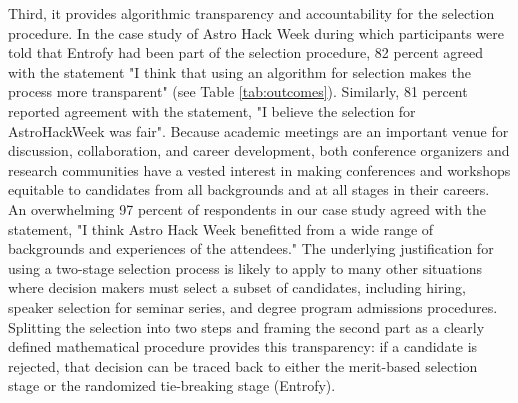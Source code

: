 \documentclass[10pt,letterpaper]{article}
\begin{document}
Third, it provides algorithmic transparency and accountability for the selection procedure. In the case study of Astro Hack Week during which participants were told that Entrofy had been part of the selection procedure, 82 percent agreed with the statement "I think that using an algorithm for selection makes the process more transparent" (see Table \ref{tab:outcomes}). Similarly, 81 percent reported agreement with the statement, "I believe the selection for AstroHackWeek was fair". Because academic meetings are an important venue for discussion, collaboration, and career development, both conference organizers and research communities have a vested interest in making conferences and workshops equitable to candidates from all backgrounds and at all stages in their careers. An overwhelming 97 percent of respondents in our case study agreed with the statement, "I think Astro Hack Week benefitted from a wide range of backgrounds and experiences of the attendees."
The underlying justification for using a two-stage selection process is likely to apply to many other situations where decision makers must select a subset of candidates, including hiring, speaker selection for seminar series, and degree program admissions procedures.
Splitting the selection into two steps and framing the second part as a clearly defined mathematical procedure provides this transparency: if a candidate is rejected, that decision can be traced back to either the merit-based selection stage or the randomized tie-breaking stage (Entrofy).
\end{document}
